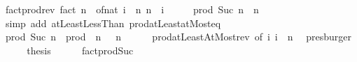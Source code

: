 \begin{isabellebody}
\ fact{\isacharunderscore}{\kern0pt}prod{\isacharunderscore}{\kern0pt}rev{\isacharcolon}{\kern0pt}\ {\isachardoublequoteopen}fact\ n\ {\isacharequal}{\kern0pt}\ of{\isacharunderscore}{\kern0pt}nat\ {\isacharparenleft}{\kern0pt}{\isasymProd}i\ {\isacharequal}{\kern0pt}\ {}{\isachardot}{\kern0pt}{\isachardot}{\kern0pt}{\isacharless}{\kern0pt}n{\isachardot}{\kern0pt}\ n\ {\isacharminus}{\kern0pt}\ i{\isacharparenright}{\kern0pt}{\isachardoublequoteclose}\isanewline
%
\isadelimproof
%
\endisadelimproof
%
\isatagproof
{}\isamarkupfalse%
\ {\isacharminus}{\kern0pt}\isanewline
\ \ \isamarkupfalse%
\ {\isachardoublequoteopen}prod\ Suc\ {\isacharbraceleft}{\kern0pt}{}{\isachardot}{\kern0pt}{\isachardot}{\kern0pt}{\isacharless}{\kern0pt}n{\isacharbraceright}{\kern0pt}\ {\isacharequal}{\kern0pt}\ {\isasymProd}{\isacharbraceleft}{\kern0pt}{}{\isachardot}{\kern0pt}{\isachardot}{\kern0pt}n{\isacharbraceright}{\kern0pt}{\isachardoublequoteclose}\isanewline
\ \ \ \ \isamarkupfalse%
\ {\isacharparenleft}{\kern0pt}simp\ add{\isacharcolon}{\kern0pt}\ atLeast{}LessThan\ prod{\isachardot}{\kern0pt}atLeast{}{\isacharunderscore}{\kern0pt}atMost{\isacharunderscore}{\kern0pt}eq{\isacharparenright}{\kern0pt}\isanewline
\ \ \isamarkupfalse%
\ \isamarkupfalse%
\ {\isachardoublequoteopen}prod\ Suc\ {\isacharbraceleft}{\kern0pt}{}{\isachardot}{\kern0pt}{\isachardot}{\kern0pt}{\isacharless}{\kern0pt}n{\isacharbraceright}{\kern0pt}\ {\isacharequal}{\kern0pt}\ prod\ {\isacharparenleft}{\kern0pt}{\isacharparenleft}{\kern0pt}{\isacharminus}{\kern0pt}{\isacharparenright}{\kern0pt}\ {\isacharparenleft}{\kern0pt}n\ {\isacharplus}{\kern0pt}\ {}{\isacharparenright}{\kern0pt}{\isacharparenright}{\kern0pt}\ {\isacharbraceleft}{\kern0pt}{}{\isachardot}{\kern0pt}{\isachardot}{\kern0pt}n{\isacharbraceright}{\kern0pt}{\isachardoublequoteclose}\isanewline
\ \ \ \ \isamarkupfalse%
\ prod{\isachardot}{\kern0pt}atLeastAtMost{\isacharunderscore}{\kern0pt}rev\ {\isacharbrackleft}{\kern0pt}of\ {\isachardoublequoteopen}{\isasymlambda}i{\isachardot}{\kern0pt}\ i{\isachardoublequoteclose}\ {}\ n{\isacharbrackright}{\kern0pt}\ \isamarkupfalse%
\ presburger\isanewline
\ \ \isamarkupfalse%
\ \isamarkupfalse%
\ {\isacharquery}{\kern0pt}thesis\isanewline
\ \ \ \ \isamarkupfalse%
\ fact{\isacharunderscore}{\kern0pt}prod{\isacharunderscore}{\kern0pt}Suc\ \isamarkupfalse%

\end{isabellebody}
